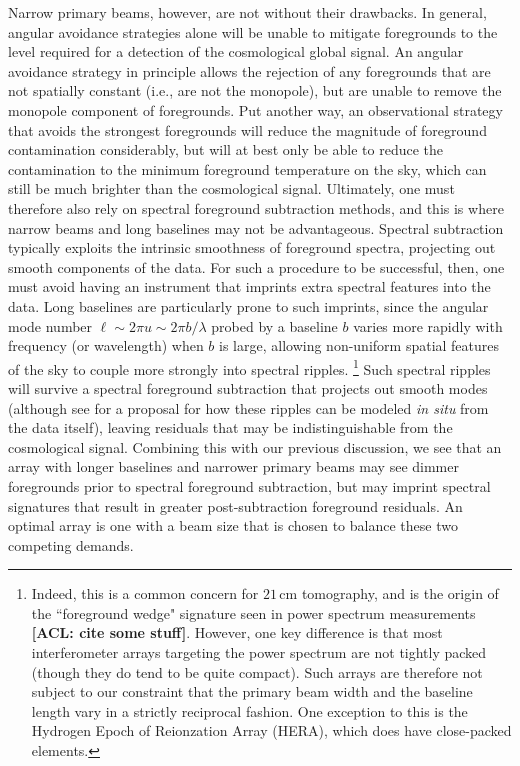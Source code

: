 \documentclass[twocolumn,apj,numberedappendix]{emulateapj}
\newcommand{\acl}[1]{{\color{red} \textbf{[ACL:  #1]}}}
\begin{document}
Narrow primary beams, however, are not without their drawbacks. In general, angular avoidance strategies alone will be unable to mitigate foregrounds to the level required for a detection of the cosmological global signal. An angular avoidance strategy in principle allows the rejection of any foregrounds that are not spatially constant (i.e., are not the monopole), but are unable to remove the monopole component of foregrounds. Put another way, an observational strategy that avoids the strongest foregrounds will reduce the magnitude of foreground contamination considerably, but will at best only be able to reduce the contamination to the minimum foreground temperature on the sky, which can still be much brighter than the cosmological signal. Ultimately, one must therefore also rely on spectral foreground subtraction methods, and this is where narrow beams and long baselines may not be advantageous. Spectral subtraction typically exploits the intrinsic smoothness of foreground spectra, projecting out smooth components of the data. For such a procedure to be successful, then, one must avoid having an instrument that imprints extra spectral features into the data. Long baselines are particularly prone to such imprints, since the angular mode number $\ell \sim 2 \pi u \sim 2 \pi b / \lambda$ probed by a baseline $b$ varies more rapidly with frequency (or wavelength) when $b$ is large, allowing non-uniform spatial features of the sky to couple more strongly into spectral ripples. \footnote{Indeed, this is a common concern for $21\,\textrm{cm}$ tomography, and is the origin of the ``foreground wedge" signature seen in power spectrum measurements\acl{cite some stuff}. However, one key difference is that most interferometer arrays targeting the power spectrum are not tightly packed (though they do tend to be quite compact). Such arrays are therefore not subject to our constraint that the primary beam width and the baseline length vary in a strictly reciprocal fashion. One exception to this is the Hydrogen Epoch of Reionzation Array (HERA), which does have close-packed elements.} Such spectral ripples will survive a spectral foreground subtraction that projects out smooth modes (although see \citealt{Liu_Switzer_2014} for a proposal for how these ripples can be modeled \emph{in situ} from the data itself), leaving residuals that may be indistinguishable from the cosmological signal. Combining this with our previous discussion, we see that an array with longer baselines and narrower primary beams may see dimmer foregrounds prior to spectral foreground subtraction, but may imprint spectral signatures that result in greater post-subtraction foreground residuals. An optimal array is one with a beam size that is chosen to balance these two competing demands.
\end{document}

